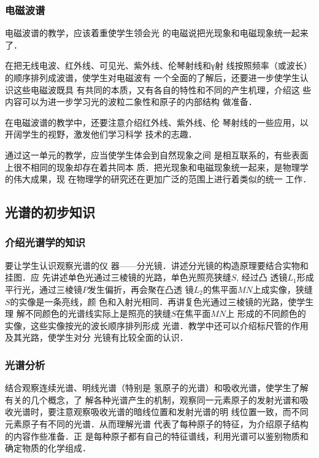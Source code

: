 \subsubsection{电磁波谱} 
电磁波谱的教学，应该着重使学生领会光
的电磁说把光现象和电磁现象统一起来了．

在把无线电波、红外线、可见光、紫外线、伦琴射线和γ射
线按照频率（或波长）的顺序排列成波谱，使学生对电磁波有
一个全面的了解后，还要进一步使学生认识这些电磁波既具
有共同的本质，又有各自的特性和不同的产生机理，介绍这
些内容可以为进一步学习光的波粒二象性和原子的内部结构
做准备．

在电磁波谱的教学中，还要注意介绍红外线、紫外线、伦
琴射线的一些应用，以开阔学生的视野，激发他们学习科学
技术的志趣．

通过这一单元的教学，应当使学生体会到自然现象之间
是相互联系的，有些表面上很不相同的现象却存在着共同本
质．把光现象和电磁现象统一起来，是物理学的伟大成果，现
在物理学的研究还在更加广泛的范围上进行着类似的统一
工作．

\subsection{光谱的初步知识}
\subsubsection{介绍光谱学的知识}

要让学生认识观察光谱的仪
器——分光镜．讲述分光镜的构造原理要结合实物和挂图．应
先讲述单色光通过三棱镜的光路，单色光照亮狭缝$S$, 经过凸
透镜$L_1$形成平行光，通过三棱镜$P$发生偏折，再会聚在凸透
镜$L_2$的焦平面$MN$上成实像，狭缝$S$的实像是一条亮线，颜
色和入射光相同．再讲复色光通过三棱镜的光路，使学生理
解不同颜色的光谱线实际上是照亮的狭缝$S$在焦平面$MN$上
形成的不同颜色的实像，这些实像按光的波长顺序排列形成
光谱．教学中还可以介绍标尺管的作用及其光路，使学生对分
光镜有比较全面的认识．

\subsubsection{光谱分析}

结合观察连续光谱、明线光谱（特别是
氢原子的光谱）和吸收光谱，使学生了解有关的几个概念，了
解各种光谱产生的机制，观察同一元素原子的发射光谱和吸
收光谱时，要注意观察吸收光谱的暗线位置和发射光谱的明
线位置一致，而不同元素原子有不同的光谱．从而理解光谱
代表了每种原子的特征，为介绍原子结构的内容作些准备．正
是每种原子都有自己的特征谱线，利用光谱可以鉴别物质和
确定物质的化学组成．

